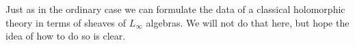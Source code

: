 \documentclass[10pt]{amsart}
\begin{document}
\begin{rmk}
Just as in the ordinary case we can formulate the data of a classical holomorphic theory in terms of sheaves of $L_\infty$ algebras. 
We will not do that here, but hope the idea of how to do so is clear.
\end{rmk}

%
%
%
%
%
\end{document}
